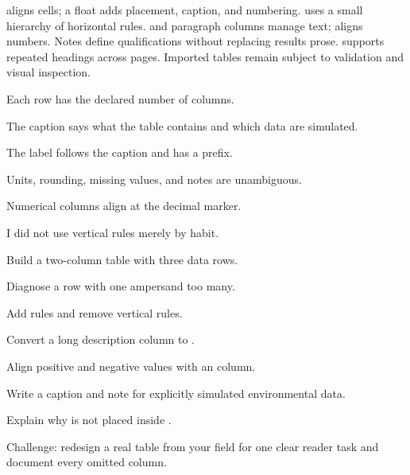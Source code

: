  aligns cells; a  float adds placement, caption, and
numbering.  uses a small hierarchy of horizontal rules.
 and paragraph columns manage text;  aligns numbers.
Notes define qualifications without replacing results prose. 
supports repeated headings across pages. Imported tables remain subject to
validation and visual inspection.

\chaptercheck
\begin{chapterchecklist}
  \item Each row has the declared number of columns.
  \item The caption says what the table contains and which data are simulated.
  \item The label follows the caption and has a  prefix.
  \item Units, rounding, missing values, and notes are unambiguous.
  \item Numerical columns align at the decimal marker.
  \item I did not use vertical rules merely by habit.
\end{chapterchecklist}

\chapterexercisestitle
\begin{chapterexercises}
  \item Build a two-column table with three data rows.
  \item Diagnose a row with one ampersand too many.
  \item Add  rules and remove vertical rules.
  \item Convert a long description column to .
  \item Align positive and negative values with an  column.
  \item Write a caption and note for explicitly simulated environmental data.
  \item Explain why  is not placed inside .
  \item Challenge: redesign a real table from your field for one clear reader
        task and document every omitted column.
\end{chapterexercises}
